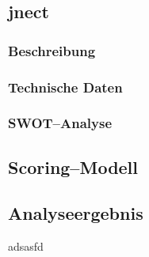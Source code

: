 \subsection{jnect}

\subsubsection{Beschreibung}

\subsubsection{Technische Daten}

\subsubsection{SWOT--Analyse}

\subsection{Scoring--Modell}

\subsection{Analyseergebnis}
adsasfd
